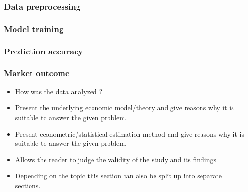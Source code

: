 \subsubsection{Data preprocessing}

\subsubsection{Model training}

\subsubsection{Prediction accuracy}

\subsubsection{Market outcome}
 




\begin{itemize}

    \item How was the data analyzed ?

    \item Present the underlying economic model/theory and
        give reasons why it is suitable to answer the given problem.

    \item Present econometric/statistical estimation method and
        give reasons why it is suitable to answer the given problem.

    \item Allows the reader to judge the validity of the study and its findings.

    \item Depending on the topic this section can also be split up into separate sections.

\end{itemize}
